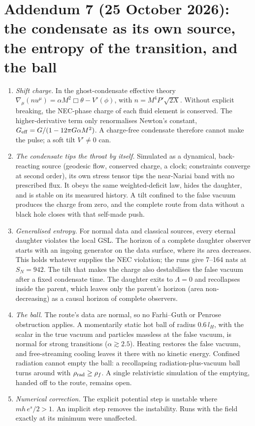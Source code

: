 \documentclass[11pt,a4paper]{article}
\theoremstyle{remark}\newtheorem{remark}[theorem]{Remark}
\begin{document}
\section*{Addendum 7 (25 October 2026): the condensate as its own source, the entropy of the transition, and the ball}
\begin{enumerate}
\item \emph{Shift charge.} In the ghost-condensate effective theory $\nabla_\mu(nu^\mu)=\alpha M^2\Box\theta-V'(\phi)$, with $n=M^4P'\sqrt{2X}$. Without
explicit breaking, the NEC-phase charge of each fluid element is conserved. The higher-derivative term only renormalises Newton's constant,
$G_{\rm eff}=G/(1-12\pi G\alpha M^2)$. A charge-free condensate therefore cannot make the pulse; a soft tilt $V'\ne0$ can.
\item \emph{The condensate tips the throat by itself.} Simulated as a dynamical, back-reacting source (geodesic flow, conserved charge, a clock;
constraints converge at second order), its own stress tensor tips the near-Nariai band with no prescribed flux. It obeys the same weighted-deficit
law, hides the daughter, and is stable on its measured history. A tilt confined to the false vacuum produces the charge from zero, and the
complete route from data without a black hole closes with that self-made push.
\item \emph{Generalised entropy.} For normal data and classical sources, every eternal daughter violates the local GSL. The horizon of a complete
daughter observer starts with an ingoing generator on the data surface, where its area decreases. This holds whatever supplies the NEC violation;
the runs give 7--164 nats at $S_N=942$. The tilt that makes the charge also destabilises the false vacuum after a fixed condensate time. The daughter
exits to $\Lambda=0$ and recollapses inside the parent, which leaves only the parent's horizon (area non-decreasing) as a causal horizon of complete
observers.
\item \emph{The ball.} The route's data are normal, so no Farhi--Guth or Penrose obstruction applies. A momentarily static hot ball of radius $0.6\,l_H$,
with the scalar in the true vacuum and particles massless at the false vacuum, is normal for strong transitions ($\alpha\gtrsim2.5$). Heating restores
the false vacuum, and free-streaming cooling leaves it there with no kinetic energy. Confined radiation cannot empty the ball: a recollapsing
radiation-plus-vacuum ball turns around with $\rho_{\rm rad}\ge\rho_f$. A single relativistic simulation of the emptying, handed off to the route,
remains open.
\item \emph{Numerical correction.} The explicit potential step is unstable where $mh\,e^s/2>1$. An implicit step removes the instability. Runs with the
field exactly at its minimum were unaffected.
\end{enumerate}
\end{document}
